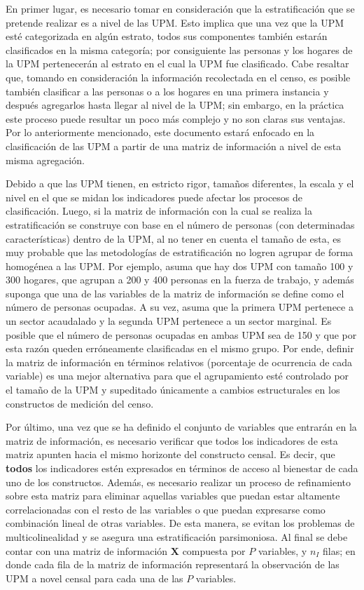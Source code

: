 \documentclass[
  10pt,
  spanish,
]{book}
\begin{document}
En primer lugar, es necesario tomar en consideración que la estratificación que se pretende realizar es a nivel de las UPM. Esto implica que una vez que la UPM esté categorizada en algún estrato, todos sus componentes también estarán clasificados en la misma categoría; por consiguiente las personas y los hogares de la UPM pertenecerán al estrato en el cual la UPM fue clasificado. Cabe resaltar que, tomando en consideración la información recolectada en el censo, es posible también clasificar a las personas o a los hogares en una primera instancia y después agregarlos hasta llegar al nivel de la UPM; sin embargo, en la práctica este proceso puede resultar un poco más complejo y no son claras sus ventajas. Por lo anteriormente mencionado, este documento estará enfocado en la clasificación de las UPM a partir de una matriz de información a nivel de esta misma agregación.

Debido a que las UPM tienen, en estricto rigor, tamaños diferentes, la escala y el nivel en el que se midan los indicadores puede afectar los procesos de clasificación. Luego, si la matriz de información con la cual se realiza la estratificación se construye con base en el número de personas (con determinadas características) dentro de la UPM, al no tener en cuenta el tamaño de esta, es muy probable que las metodologías de estratificación no logren agrupar de forma homogénea a las UPM. Por ejemplo, asuma que hay dos UPM con tamaño 100 y 300 hogares, que agrupan a 200 y 400 personas en la fuerza de trabajo, y además suponga que una de las variables de la matriz de información se define como el número de personas ocupadas. A su vez, asuma que la primera UPM pertenece a un sector acaudalado y la segunda UPM pertenece a un sector marginal. Es posible que el número de personas ocupadas en ambas UPM sea de 150 y que por esta razón queden erróneamente clasificadas en el mismo grupo. Por ende, definir la matriz de información en términos relativos (porcentaje de ocurrencia de cada variable) es una mejor alternativa para que el agrupamiento esté controlado por el tamaño de la UPM y supeditado únicamente a cambios estructurales en los constructos de medición del censo.

Por último, una vez que se ha definido el conjunto de variables que entrarán en la matriz de información, es necesario verificar que todos los indicadores de esta matriz apunten hacia el mismo horizonte del constructo censal. Es decir, que \textbf{todos} los indicadores estén expresados en términos de acceso al bienestar de cada uno de los constructos. Además, es necesario realizar un proceso de refinamiento sobre esta matriz para eliminar aquellas variables que puedan estar altamente correlacionadas con el resto de las variables o que puedan expresarse como combinación lineal de otras variables. De esta manera, se evitan los problemas de multicolinealidad y se asegura una estratificación parsimoniosa. Al final se debe contar con una matriz de información \(\mathbf{X}\) compuesta por \(P\) variables, y \(n_I\) filas; en donde cada fila de la matriz de información representará la observación de las UPM a novel censal para cada una de las \(P\) variables.
\end{document}
